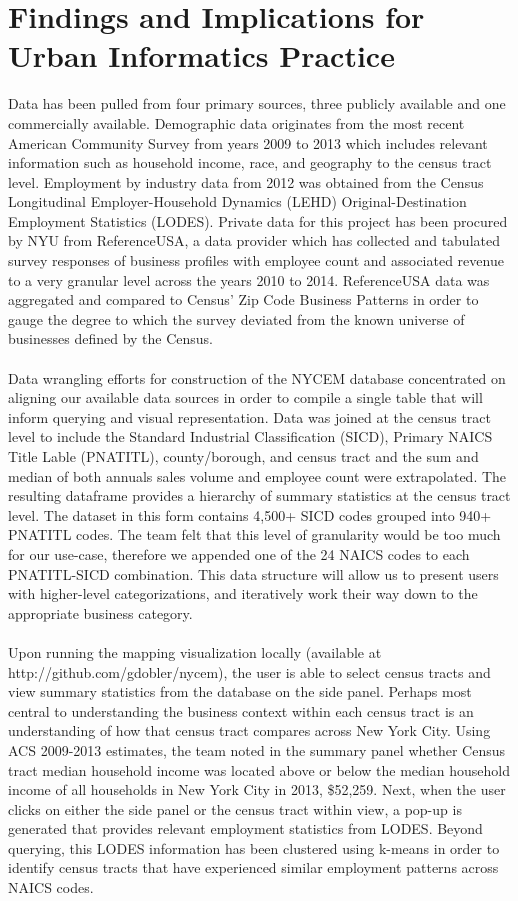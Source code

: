 \documentclass[11pt]{article} %
\begin{document}

\section*{Findings and Implications for Urban Informatics Practice}

Data has been pulled from four primary sources, three publicly available and one commercially available. Demographic data originates from the most recent American Community Survey from years 2009 to 2013 which includes relevant information such as household income, race, and geography to the census tract level. Employment by industry data from 2012 was obtained from the Census Longitudinal Employer-Household Dynamics (LEHD) Original-Destination Employment Statistics (LODES). Private data for this project has been procured by NYU from ReferenceUSA, a data provider which has collected and tabulated survey responses of business profiles with employee count and associated revenue to a very granular level across the years 2010 to 2014. ReferenceUSA data was aggregated and compared to Census' Zip Code Business Patterns in order to gauge the degree to which the survey deviated from the known universe of businesses defined by the Census.
\\\\
Data wrangling efforts for construction of the NYCEM database concentrated on aligning our available data sources in order to compile a single table that will inform querying and visual representation. Data was joined at the census tract level to include the Standard Industrial Classification (SICD), Primary NAICS Title Lable (PNATITL), county/borough, and census tract and the sum and median of both annuals sales volume and employee count were extrapolated. The resulting dataframe provides a hierarchy of summary statistics at the census tract level. The dataset in this form contains 4,500+ SICD codes grouped into 940+ PNATITL codes. The team felt that this level of granularity would be too much for our use-case, therefore we appended one of the 24 NAICS codes to each PNATITL-SICD combination. This data structure will allow us to present users with higher-level categorizations, and iteratively work their way down to the appropriate business category.
\\\\
Upon running the mapping visualization locally (available at http://github.com/gdobler/nycem), the user is able to select census tracts and view summary statistics from the database on the side panel. Perhaps most central to understanding the business context within each census tract is an understanding of how that census tract compares across New York City. Using ACS 2009-2013 estimates, the team noted in the summary panel whether Census tract median household income was located above or below the median household income of all households in New York City in 2013, \$52,259. Next, when the user clicks on either the side panel or the census tract within view, a pop-up is generated that provides relevant employment statistics from LODES. Beyond querying, this LODES information has been clustered using k-means in order to identify census tracts that have experienced similar employment patterns across NAICS codes.
\end{document}
